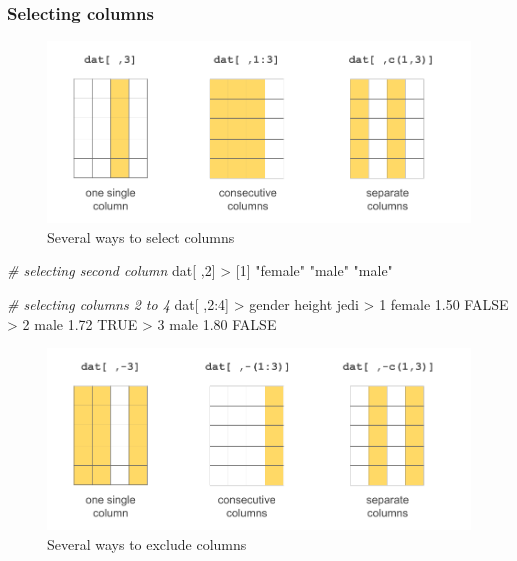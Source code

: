 \documentclass[
]{book}
\newenvironment{Shaded}{\begin{snugshade}}{\end{snugshade}}
\newcommand{\CommentTok}[1]{\textcolor[rgb]{0.56,0.35,0.01}{\textit{#1}}}
\newcommand{\ConstantTok}[1]{\textcolor[rgb]{0.00,0.00,0.00}{#1}}
\newcommand{\DecValTok}[1]{\textcolor[rgb]{0.00,0.00,0.81}{#1}}
\newcommand{\FloatTok}[1]{\textcolor[rgb]{0.00,0.00,0.81}{#1}}
\newcommand{\NormalTok}[1]{#1}
\newcommand{\SpecialCharTok}[1]{\textcolor[rgb]{0.00,0.00,0.00}{#1}}
\newcommand{\StringTok}[1]{\textcolor[rgb]{0.31,0.60,0.02}{#1}}
\begin{document}
\hypertarget{selecting-columns-1}{%
\subsubsection*{Selecting columns}\label{selecting-columns-1}}

\begin{figure}

{\centering \includegraphics[width=0.8\linewidth]{images/objects/obj-dataframe-cols1} 

}

\caption{Several ways to select columns}\label{fig:unnamed-chunk-184}
\end{figure}

\begin{Shaded}
\begin{Highlighting}[]
\CommentTok{\# selecting second column}
\NormalTok{dat[ ,}\DecValTok{2}\NormalTok{]}
\SpecialCharTok{\textgreater{}}\NormalTok{ [}\DecValTok{1}\NormalTok{] }\StringTok{"female"} \StringTok{"male"}   \StringTok{"male"}

\CommentTok{\# selecting columns 2 to 4}
\NormalTok{dat[ ,}\DecValTok{2}\SpecialCharTok{:}\DecValTok{4}\NormalTok{]}
\SpecialCharTok{\textgreater{}}\NormalTok{   gender height  jedi}
\SpecialCharTok{\textgreater{}} \DecValTok{1}\NormalTok{ female   }\FloatTok{1.50} \ConstantTok{FALSE}
\SpecialCharTok{\textgreater{}} \DecValTok{2}\NormalTok{   male   }\FloatTok{1.72}  \ConstantTok{TRUE}
\SpecialCharTok{\textgreater{}} \DecValTok{3}\NormalTok{   male   }\FloatTok{1.80} \ConstantTok{FALSE}
\end{Highlighting}
\end{Shaded}

\begin{figure}

{\centering \includegraphics[width=0.8\linewidth]{images/objects/obj-dataframe-cols2} 

}

\caption{Several ways to exclude columns}\label{fig:unnamed-chunk-186}
\end{figure}
\end{document}
